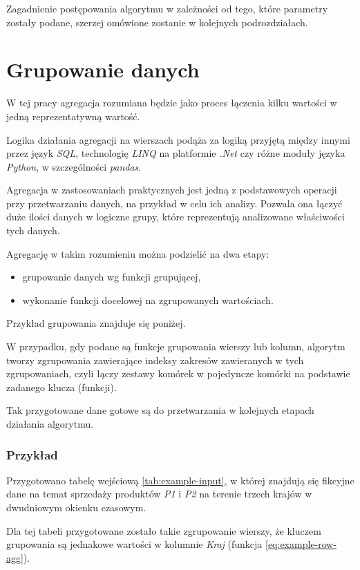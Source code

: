 \documentclass[brudnopis]{xmgr}
\begin{document}
Zagadnienie postępowania algorytmu w zależności od tego, które parametry zostały podane, szerzej omówione zostanie w kolejnych podrozdziałach.


\section{Grupowanie danych}

W tej pracy agregacja rozumiana będzie jako proces łączenia kilku wartości w jedną reprezentatywną wartość.
\medskip

Logika działania agregacji na wierszach podąża za logiką przyjętą między innymi przez język \emph{SQL}, technologię \emph{LINQ} \cite{linq} na platformie \emph{.Net} czy różne moduły języka \emph{Python}, w szczególności \emph{pandas}.
\medskip

Agregacja w zastosowaniach praktycznych jest jedną z podstawowych operacji przy przetwarzaniu danych, na przykład w celu ich analizy.
Pozwala ona łączyć duże ilości danych w logiczne grupy, które reprezentują analizowane właściwości tych danych.
\medskip

Agregację w takim rozumieniu można podzielić na dwa etapy:
\begin{itemize}
    \item grupowanie danych wg funkcji grupującej,
    \item wykonanie funkcji docelowej na zgrupowanych wartościach.
\end{itemize}
\medskip

Przykład grupowania znajduje się poniżej.
\medskip

W przypadku, gdy podane są funkcje grupowania wierszy lub kolumn, algorytm tworzy zgrupowania zawierające indeksy zakresów zawieranych w tych zgrupowaniach, czyli łączy zestawy komórek w pojedyncze komórki na podstawie zadanego klucza (funkcji).
\medskip

Tak przygotowane dane gotowe są do przetwarzania w kolejnych etapach działania algorytmu.

\subsubsection{Przykład}
\medskip

Przygotowano tabelę wejściową \ref{tab:example-input}, w której znajdują się fikcyjne dane na temat sprzedaży produktów \emph{P1} i \emph{P2} na terenie trzech krajów w dwudniowym okienku czasowym.
\medskip

Dla tej tabeli przygotowane zostało takie zgrupowanie wierszy, że kluczem grupowania są jednakowe wartości w kolumnie \emph{Kraj} (funkcja \ref{eq:example-row-agg}).
\medskip
\end{document}
